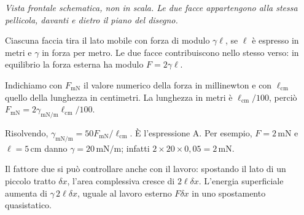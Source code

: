 \documentclass[11pt,a4paper]{article}
\begin{document}
\begin{samepage}
\begin{center}
\par
\small\itshape Vista frontale schematica, non in scala. Le due facce appartengono alla stessa pellicola, davanti e dietro il piano del disegno.
\end{center}
Ciascuna faccia tira il lato mobile con forza di modulo \(\gamma\ell\), se \(\ell\) è espresso in metri e \(\gamma\) in forza per metro. Le due facce contribuiscono nello stesso verso: in equilibrio la forza esterna ha modulo \(F=2\gamma\ell\).\par

Indichiamo con \(F_{\mathrm{mN}}\) il valore numerico della forza in millinewton e con \(\ell_{\mathrm{cm}}\) quello della lunghezza in centimetri. La lunghezza in metri è \(\ell_{\mathrm{cm}}/100\), perciò \(F_{\mathrm{mN}}=2\gamma_{\mathrm{mN/m}}\ell_{\mathrm{cm}}/100\).\par

Risolvendo, \(\gamma_{\mathrm{mN/m}}=50F_{\mathrm{mN}}/\ell_{\mathrm{cm}}\). È l’espressione A. Per esempio, \(F=2\,\mathrm{mN}\) e \(\ell=5\,\mathrm{cm}\) danno \(\gamma=20\,\mathrm{mN/m}\); infatti \(2\times20\times0{,}05=2\,\mathrm{mN}\).\par

Il fattore due si può controllare anche con il lavoro: spostando il lato di un piccolo tratto \(\delta x\), l’area complessiva cresce di \(2\ell\delta x\). L’energia superficiale aumenta di \(\gamma\,2\ell\delta x\), uguale al lavoro esterno \(F\delta x\) in uno spostamento quasistatico.\par

\end{samepage}
\end{document}
